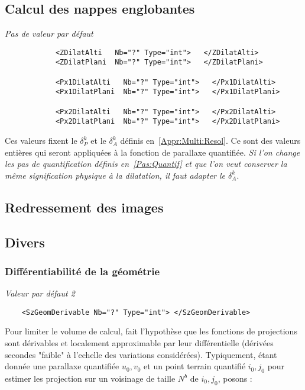 \subsection{Calcul des nappes englobantes}

\emph{Pas de valeur par d\'efaut}
\begin{verbatim}
            <ZDilatAlti   Nb="?" Type="int">   </ZDilatAlti>
            <ZDilatPlani  Nb="?" Type="int">   </ZDilatPlani>

            <Px1DilatAlti   Nb="?" Type="int">   </Px1DilatAlti>
            <Px1DilatPlani  Nb="?" Type="int">   </Px1DilatPlani>

            <Px2DilatAlti   Nb="?" Type="int">   </Px2DilatAlti>
            <Px2DilatPlani  Nb="?" Type="int">   </Px2DilatPlani>
\end{verbatim}


Ces valeurs fixent le $\delta_{P}^k$ et le $\delta_{A}^k$ d\'efinis
en~\ref{Appr:Multi:Resol}. Ce sont des valeurs enti\`eres qui seront
appliqu\'ees \`a la fonction de parallaxe quantifi\'ee. \emph{Si
l'on change  les pas de quantification d\'efinis en~\ref{Pas:Quantif}
et que l'on veut conserver la m\^eme signification physique \`a la
dilatation, il faut adapter le  $\delta_{A}^k$}.



\subsection{Redressement des images}

\subsection{Divers}

\subsubsection{Diff\'erentiabilit\'e de la g\'eom\'etrie}

\emph{Valeur par d\'efaut 2}
\begin{verbatim}
    <SzGeomDerivable Nb="?" Type="int"> </SzGeomDerivable>
\end{verbatim}

Pour limiter le volume de calcul, fait l'hypoth\`ese que les
fonctions de projections sont d\'erivables et localement
approximable par leur diff\'erentielle (d\'eriv\'ees secondes
"faible" \`a l'echelle des variations consid\'er\'ees). Typiquement, \'etant
donn\'ee une parallaxe quantifi\'ee $u_0,v_0$ et un point
terrain quantifi\'e $i_0,j_0$ pour estimer les  projection
sur un voisinage de taille $N^b$ de $i_0,j_0$, posons :

